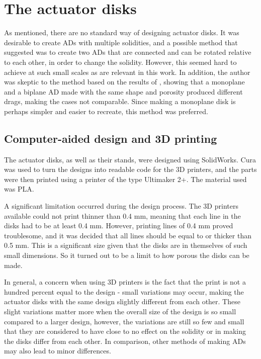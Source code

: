 \section{The actuator disks}
As mentioned, there are no standard way of designing actuator disks. It was desirable to create ADs with multiple solidities, and a possible method that suggested was to create two ADs that are connected and can be rotated relative to each other, in order to change the solidity. However, this seemed hard to achieve at such small scales as are relevant in this work. In addition, the author was skeptic to the method based on the results of \cite{Pierella2010}, showing that a monoplane and a biplane AD made with the same shape and porosity produced different drags, making the cases not comparable. Since making a monoplane disk is perhaps simpler and easier to recreate, this method was preferred. 
 

\subsection{Computer-aided design and 3D printing}
The actuator disks, as well as their stands, were designed using SolidWorks. Cura was used to turn the designs into readable code for the 3D printers, and the parts were then printed using a printer of the type Ultimaker 2+. The material used was PLA.

A significant limitation occurred during the design process. The 3D printers available could not print thinner than 0.4 mm, meaning that each line in the disks had to be at least 0.4 mm. However, printing lines of 0.4 mm proved troublesome, and it was decided that all lines should be equal to or thicker than 0.5 mm. This is a significant size given that the disks are in themselves of such small dimensions. So it turned out to be a limit to how porous the disks can be made. 

In general, a concern when using 3D printers is the fact that the print is not a hundred percent equal to the design - small variations may occur, making the actuator disks with the same design slightly different from each other. These slight variations matter more when the overall size of the design is so small compared to a larger design, however, the variations are still so few and small that they are considered to have close to no effect on the solidity or in making the disks differ from each other. In comparison, other methods of making ADs may also lead to minor differences. 

